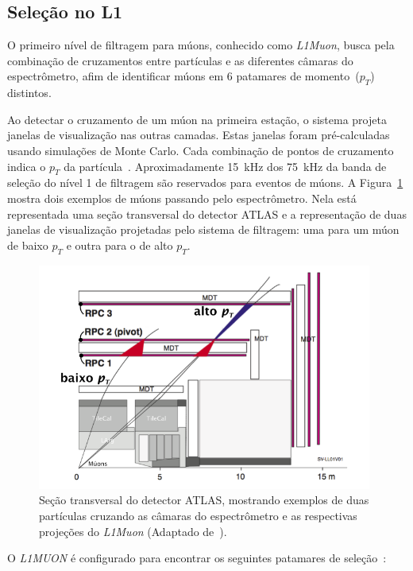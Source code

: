 \subsection{Seleção no L1}

O primeiro nível de filtragem para múons, conhecido como \emph{L1Muon}, busca
pela combinação de cruzamentos entre partículas e as diferentes câmaras do
espectrômetro, afim de identificar múons em 6 patamares de momento~($p_T$) distintos.

Ao detectar o cruzamento de um múon na primeira estação, o sistema projeta
janelas de visualização nas outras camadas. Estas janelas foram pré-calculadas
usando simulações de Monte Carlo. Cada combinação de pontos de cruzamento indica
o $p_T$ da partícula~\cite{BUTTINGER2012}. Aproximadamente 15~kHz dos 75~kHz da
banda de seleção do nível 1 de filtragem são reservados para eventos de múons. A
Figura~\ref{fig:MSMUON} mostra dois exemplos de múons passando pelo
espectrômetro. Nela está representada uma seção transversal do detector ATLAS e
a representação de duas janelas de visualização projetadas pelo sistema de
filtragem: uma para um múon de baixo $p_T$ e outra para o de alto $p_T$.


\begin{figure}[htpb!]
    \centering
    \includegraphics[width=11cm]{images/MS_transversal.png}
    \caption[Seção transversal do detector ATLAS, mostrando exemplos de duas
    partículas cruzando as câmaras do espectrômetro e as respectivas projeções
    do \emph{L1Muon}]{Seção transversal do detector ATLAS, mostrando exemplos de duas
    partículas cruzando as câmaras do espectrômetro e as respectivas projeções
    do \emph{L1Muon} (Adaptado de~\cite{BUTTINGER2012}).}
    \label{fig:MSMUON}
\end{figure}

O \emph{L1MUON} é configurado para encontrar os seguintes patamares de
seleção~\cite{BUTTINGER2012}:

